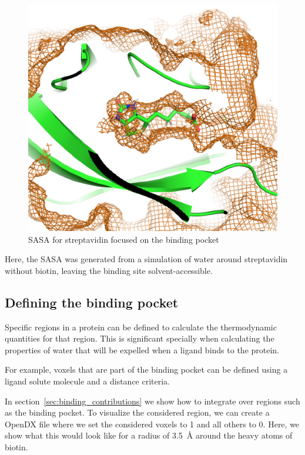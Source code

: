 \documentclass[9pt,tutorial]{livecoms}
\begin{document}
\begin{figure}
	\centering
	\includegraphics[width=1.0\linewidth]{figures/sasa-simple.png}
	\caption{SASA for streptavidin focused on the binding pocket}\label{fig-streptavidin_sasa}
\end{figure}

Here, the SASA was generated from a simulation of water around streptavidin without biotin, leaving the binding site solvent-accessible.

\subsection{Defining the binding pocket}
Specific regions in a protein can be defined to calculate the thermodynamic quantities for that region.
This is significant specially when calculating the properties of water that will be expelled when a ligand binds to the protein.

For example, voxels that are part of the binding pocket can be defined using a ligand solute molecule and a distance criteria. 

In section~\ref{sec:binding_contributions} we show how to integrate over regions such as the binding pocket. To visualize the considered region, we can create a OpenDX file where we set the considered voxels to 1 and all others to 0. Here, we show what this would look like for a radius of \SI{3.5}{\angstrom} around the heavy atoms of biotin. 
\end{document}
